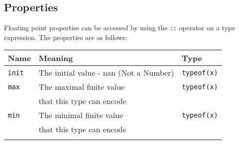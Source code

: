 \subsection{Properties}
\label{sec:org52a5d6e}

Floating point properties can be accessed by using the \texttt{::} operator on a
type expression. The properties are as follows:

\begin{center}
  \vspace{-5pt}
  \begin{adjustbox}{max width=1.01\linewidth}
    \begin{threeparttable}
      \begin{tabular}{|l|ll|}
        \hline
        Name & Meaning & Type\\[0pt]
        \hline
        \hline
        \texttt{init} & The initial value - nan (Not a Number) & \texttt{typeof(x)}\\[0pt]
        \Xhline{0.001pt}
        \texttt{max} & The maximal finite value & \texttt{typeof(x)}\\
        & that this type can encode & \\[0pt]
        \Xhline{0.001pt}

        \texttt{min} & The minimal finite value & \texttt{typeof(x)}\\
        & that this type can encode & \\[0pt]
        \Xhline{0.001pt}


\end{tabular}
\end{threeparttable}
\end{adjustbox}
\end{center}
